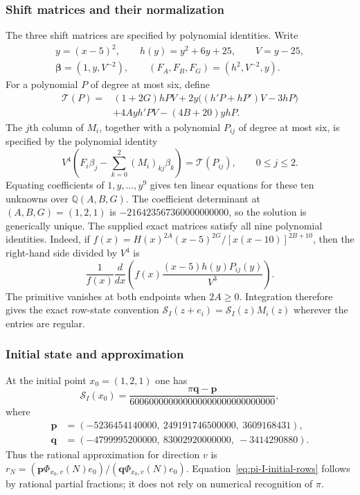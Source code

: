 \documentclass[oneside,english,11pt]{amsart}
\begin{document}
\subsubsection{Shift matrices and their normalization}
The three shift matrices are specified by polynomial identities. Write
\begin{gather*}
 y=(x-5)^2,\qquad h(y)=y^2+6y+25,\qquad V=y-25,\\
 \boldsymbol\beta=(1,y,V^{-2}),\qquad
 (F_A,F_B,F_G)=(h^2,V^{-2},y).
\end{gather*}
For a polynomial $P$ of degree at most six, define
\begin{align*}
 \mathcal T(P)={}&(1+2G)hPV
 +2y\bigl((h'P+hP')V-3hP\bigr)\\
 &+4Ayh'PV-(4B+20)yhP.
\end{align*}
The $j$th column of $M_i$, together with a polynomial $P_{ij}$ of degree at
most six, is specified by the polynomial identity
\begin{equation}\label{eq:pi-axis-coefficient-specification}
 V^4\left(F_i\beta_j-\sum_{k=0}^2(M_i)_{kj}\beta_k\right)
       =\mathcal T(P_{ij}),\qquad 0\leq j\leq2.
\end{equation}
Equating coefficients of $1,y,\ldots,y^9$ gives ten linear equations for
these ten unknowns over $\mathbb Q(A,B,G)$.  The coefficient determinant at
$(A,B,G)=(1,2,1)$ is $-216423567360000000000$, so the solution is generically
unique.  The supplied exact matrices satisfy all nine polynomial identities.
Indeed, if $f(x)=H(x)^{2A}(x-5)^{2G}/[x(x-10)]^{2B+10}$, then the
right-hand side divided by $V^4$ is
\[
 \frac1{f(x)}\frac{d}{dx}
 \left(f(x)\frac{(x-5)h(y)P_{ij}(y)}{V^3}\right).
\]
The primitive vanishes at both endpoints when $2A\geq0$.  Integration
therefore gives the exact row-state convention
$\mathcal S_I(z+e_i)=\mathcal S_I(z)M_i(z)$ wherever the entries are regular.

\subsubsection{Initial state and approximation}
At the initial point $x_0=(1,2,1)$ one has
\begin{equation}\label{eq:pi-I-initial-rows}
 \mathcal S_I(x_0)=\frac{\pi\mathbf q-\mathbf p}
 {600600000000000000000000000000},
\end{equation}
where
\[
\begin{aligned}
 \mathbf p&=(-5236454140000,\ 249191746500000,\ 3609168431),\\
 \mathbf q&=(-4799995200000,\ 83002920000000,\ -3414290880).
\end{aligned}
\]
Thus the rational approximation for direction $v$ is
$r_N=(\mathbf p\Phi_{x_0,v}(N)e_0)/(\mathbf q\Phi_{x_0,v}(N)e_0)$.
Equation~\eqref{eq:pi-I-initial-rows} follows by rational partial fractions;
it does not rely on numerical recognition of $\pi$.
\end{document}
